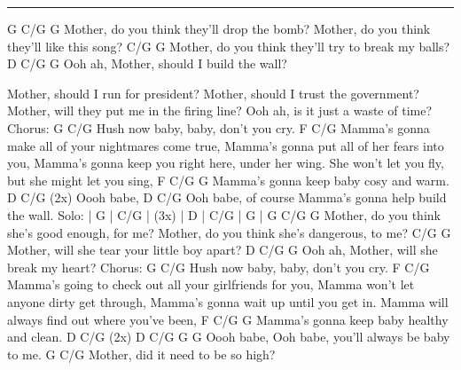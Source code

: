 \noindent\rule{\columnwidth}{1pt}

\begin{lstsong}
G                                     C/G         G
Mother, do you think they'll drop the bomb?
Mother, do you think they'll like this song?
C/G                                         G
Mother, do you think they'll try to break my balls?
D   C/G                           G
Ooh ah, Mother, should I build the wall?

Mother, should I run for president?
Mother, should I trust the government?
Mother, will they put me in the firing line?
Ooh ah, is it just a waste of time?
Chorus:
G                              C/G
Hush now baby, baby, don't you cry.
F                              C/G
Mamma's gonna make all of your nightmares come true,
Mamma's gonna put all of her fears into you,
Mamma's gonna keep you right here, under her wing.
She won't let you fly, but she might let you sing,
F                       C/G      G
Mamma's gonna keep baby cosy and warm.
D    C/G   (2x)
Oooh babe,
D               C/G
   Ooh babe, of course Mamma's gonna help build the wall.
Solo: | G     | C/G   | (3x)    | D     | C/G   | G     |
G                                C/G           G
Mother, do you think she's good enough,    for me?
Mother, do you think she's dangerous,      to me?
C/G                                    G
Mother, will she tear your little boy apart?
D   C/G                           G
Ooh ah, Mother, will she break my heart?
Chorus:
G                              C/G
Hush now baby, baby, don't you cry.
F                                   C/G
Mamma's going to check out all your girlfriends for you,
Mamma won't let anyone dirty get through,
Mamma's gonna wait up until you get in.
Mamma will always find out where you've been,
F                       C/G         G
Mamma's gonna keep baby healthy and clean.
D    C/G   (2x)    D                   C/G               G        G
Oooh babe,            Ooh babe, you'll always be baby to me.
G                            C/G
Mother, did it need to be so high?
\end{lstsong}
\newpage




